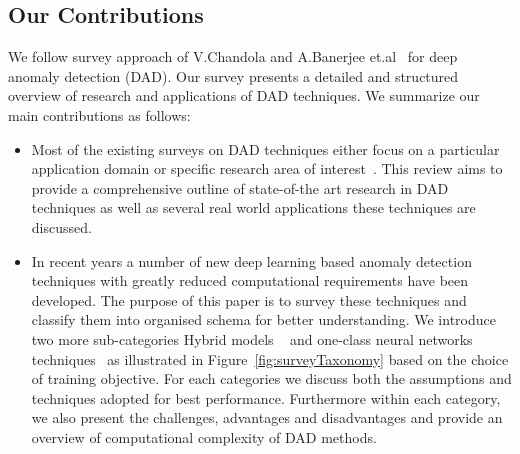 \subsection{ Our Contributions}
We follow survey approach of V.Chandola and A.Banerjee et.al~\cite{chandola2007outlier} for deep  anomaly detection (DAD). Our survey presents a detailed and structured overview of research and applications of DAD techniques. We summarize our main contributions as follows:
\begin{itemize}
\item Most of the existing surveys on DAD techniques either focus on a particular
application domain or specific research area of interest~\cite{kiran2018overview,mohammadi2017deep,litjens2017survey,kwon2017survey,adewumi2017survey,ball2017comprehensive}.
This review aims to provide a comprehensive outline of state-of-the art research in DAD techniques as well as several real world applications these techniques are discussed.
\item In recent years a number of new deep learning based anomaly detection techniques  with greatly reduced computational requirements have been developed. The purpose of this paper is to survey these techniques and classify them into organised schema for better understanding. We introduce two more sub-categories Hybrid models ~\cite{erfani2016high} and one-class neural networks techniques~\cite{chalapathy2018anomaly} as illustrated in Figure~\ref{fig:surveyTaxonomy} based on the choice of training objective. For each categories we discuss both the assumptions and techniques adopted for best performance. Furthermore within each category, we also present the challenges, advantages and disadvantages and provide an overview of computational complexity of DAD methods.
\end{itemize}

